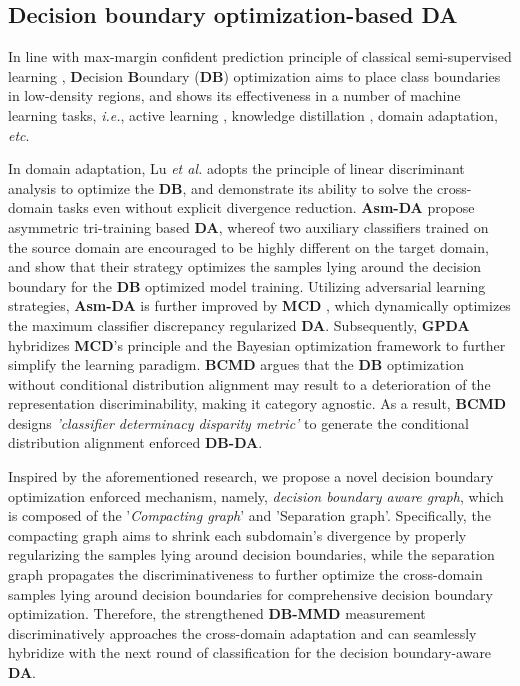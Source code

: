 \subsection{Decision boundary optimization-based \textbf{DA}}
\label{subsect: Decision boundary optimization-based DA}

In line with max-margin confident prediction principle of classical semi-supervised learning \cite{roller2004max}, \textbf{D}ecision \textbf{B}oundary (\textbf{DB}) optimization aims to place class boundaries in low-density regions,  and shows its effectiveness in a number of machine learning tasks, \textit{i.e.}, active learning \cite{cho2022mcdal}, knowledge distillation \cite{heo2019knowledge}, domain adaptation, \textit{etc}. 

In domain adaptation, Lu \textit{et al.} \cite{lu2018embarrassingly} adopts the principle of linear discriminant analysis \cite{goodfellow2016deep} to optimize the \textbf{DB}, and demonstrate its ability to solve the cross-domain tasks even without explicit divergence reduction. \textbf{Asm-DA}\cite{DBLP:conf/icml/SaitoUH17}  propose asymmetric tri-training based \textbf{DA}, whereof  two auxiliary classifiers  trained on the source domain are encouraged to be highly different on the target domain, and show that their strategy optimizes the samples lying around the decision boundary for the \textbf{DB} optimized model training. Utilizing adversarial learning strategies, \textbf{Asm-DA} is further  improved by \textbf{MCD} \cite{DBLP:conf/cvpr/SaitoWUH18}, which dynamically optimizes the maximum classifier discrepancy regularized \textbf{DA}. Subsequently, \textbf{GPDA} \cite{kim2019unsupervised} hybridizes \textbf{MCD}’s principle and the Bayesian optimization framework to further simplify the learning paradigm. \textbf{BCMD}\cite{li2021bi} argues that the \textbf{DB} optimization without conditional distribution alignment may result to a deterioration of the representation discriminability, making it category agnostic. As a result, \textbf{BCMD} designs \textit{'classifier determinacy disparity metric'} to generate the conditional distribution alignment enforced \textbf{DB-DA}.




Inspired by the aforementioned research, we propose a novel decision boundary optimization enforced mechanism, namely, \textit{decision boundary aware graph}, which is composed of the '\textit{Compacting graph}' and 'Separation graph'. Specifically, the compacting graph aims to shrink each subdomain's divergence by properly regularizing the samples lying around decision boundaries, while the separation graph propagates the discriminativeness to further optimize  the cross-domain samples lying around decision boundaries for comprehensive decision boundary optimization. Therefore, the strengthened \textbf{DB-MMD} measurement discriminatively approaches the cross-domain adaptation and can seamlessly hybridize with the next round of classification for the decision boundary-aware \textbf{DA}.
